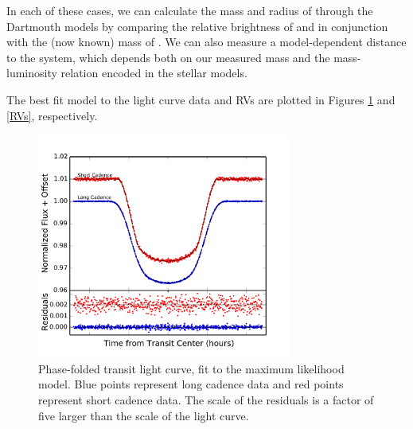 In each of these cases, we can calculate the mass and radius of \LB{} through the Dartmouth models by comparing the relative brightness of \LA{} and \LB{} in conjunction with the (now known) mass of \LA. 
We can also measure a model-dependent distance to the system, which depends both on our measured mass and the mass-luminosity relation encoded in the stellar models.

The best fit model to the light curve data and RVs are plotted in Figures \ref{LC} and \ref{RVs}, respectively.


\begin{figure}[htbp]
\centerline{\includegraphics[width=0.75\textwidth]{chapter4/f4.pdf}}
\caption[Phase-folded transit light curve, fit to the maximum likelihood model]{Phase-folded transit light curve, fit to the maximum likelihood model.
Blue points represent long cadence data and red points represent short cadence data.
The scale of the residuals is a factor of five larger than the scale of the light curve.
  }
\label{LC}
\end{figure}


